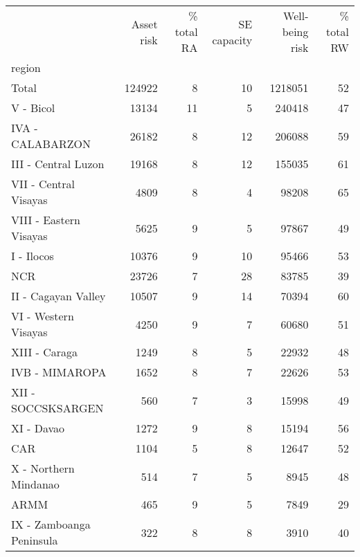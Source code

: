 \begin{tabular}{lrrrrr}
\toprule
{} &  Asset risk &  \% total RA &  SE capacity &  Well-being risk &  \% total RW \\
region                   &             &             &              &                  &             \\
\midrule
Total                    &      124922 &           8 &           10 &          1218051 &          52 \\
V - Bicol                &       13134 &          11 &            5 &           240418 &          47 \\
IVA - CALABARZON         &       26182 &           8 &           12 &           206088 &          59 \\
III - Central Luzon      &       19168 &           8 &           12 &           155035 &          61 \\
VII - Central Visayas    &        4809 &           8 &            4 &            98208 &          65 \\
VIII - Eastern Visayas   &        5625 &           9 &            5 &            97867 &          49 \\
I - Ilocos               &       10376 &           9 &           10 &            95466 &          53 \\
NCR                      &       23726 &           7 &           28 &            83785 &          39 \\
II - Cagayan Valley      &       10507 &           9 &           14 &            70394 &          60 \\
VI - Western Visayas     &        4250 &           9 &            7 &            60680 &          51 \\
XIII - Caraga            &        1249 &           8 &            5 &            22932 &          48 \\
IVB - MIMAROPA           &        1652 &           8 &            7 &            22626 &          53 \\
XII - SOCCSKSARGEN       &         560 &           7 &            3 &            15998 &          49 \\
XI - Davao               &        1272 &           9 &            8 &            15194 &          56 \\
CAR                      &        1104 &           5 &            8 &            12647 &          52 \\
X - Northern Mindanao    &         514 &           7 &            5 &             8945 &          48 \\
ARMM                     &         465 &           9 &            5 &             7849 &          29 \\
IX - Zamboanga Peninsula &         322 &           8 &            8 &             3910 &          40 \\
\bottomrule
\end{tabular}
